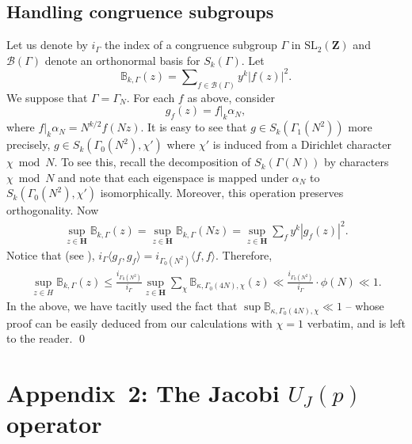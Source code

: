 \documentclass[11pt]{amsart}
\numberwithin{equation}{section}
\theoremstyle{plain}
\theoremstyle{definition}
\newcommand{\mbb}{\mathbb}
\newcommand{\mf}{\mathbf}
\newcommand{\mc}{\mathcal}
\newcommand{\mrm}{\mathrm}
\newcommand{\lan}{\langle }
\newcommand{\ran}{\rangle}
\newcommand{\sumn}{\sum \nolimits}
\newcommand{\sltwo}{\mrm{SL}_2(\mf Z)}
\begin{document}
\subsection{Handling congruence subgroups}
Let us denote by $i_\Gamma$ the index of a congruence subgroup $\Gamma$ in $\sltwo$ and $\mc B(\Gamma)$ denote an orthonormal basis for $S_k(\Gamma)$. Let 
\begin{equation}
    \mbb B_{k, \Gamma}(z) = \sumn_{f \in \mc B(\Gamma)} y^k |f(z)|^2.
\end{equation}
We suppose that $\Gamma= \Gamma_N$. For each $f$ as above, consider 
\begin{equation}
    g_f(z) = f |_k \alpha_N,
\end{equation}
where $f |_k \alpha_N = N^{k/2} f(Nz)$. It is easy to see that $g \in S_k(\Gamma_1(N^2))$ more precisely, $g \in S_k(\Gamma_0(N^2), \chi')$ where $\chi'$ is induced from a Dirichlet character $\chi \bmod N$. To see this, recall the decomposition of $S_k(\Gamma(N))$ by characters $\chi \bmod N$ and note that each eigenspace is mapped under $\alpha_N$ to $S_k(\Gamma_0(N^2), \chi')$ isomorphically.
Moreover, this operation preserves orthogonality.
Now
\begin{align}
    \sup_{z \in \mf H} \mbb B_{k, \Gamma}(z) = \sup_{z \in \mf H} \mbb B_{k, \Gamma}(Nz) = \sup_{z \in \mf H} \sumn_f y^k |g_f(z)|^2.
\end{align}
Notice that (see \cite[III, Theorem 4.1]{lang2012introduction}),
$\displaystyle  i_\Gamma\lan g_f , g_f \ran =  i_{\Gamma_0(N^2)}  \lan f,f \ran$.
Therefore,
\begin{align}
    \sup_{z \in H} \mbb B_{k, \Gamma}(z) \le \frac{ i_{\Gamma_0(N^2)} }{ i_\Gamma} \sup_{z \in \mf H} \sumn_\chi \mbb B_{\kappa ,\Gamma_0(4N), \chi}(z) \ll \frac{ i_{\Gamma_0(N^2)} }{ i_\Gamma} \cdot \phi(N) \ll 1.
\end{align}
In the above, we have tacitly used the fact that $\sup \mbb B_{\kappa ,\Gamma_0(4N), \chi} \ll 1$ -- whose proof can be easily deduced from our calculations with $\chi=1$ verbatim, and is left to the reader. \qed

\section{Appendix~2: The Jacobi  \texorpdfstring{$U_J(p)$}{n=1} operator }\label{appendix2}
\end{document}
